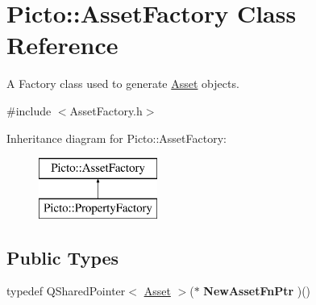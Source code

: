 \hypertarget{class_picto_1_1_asset_factory}{\section{Picto\-:\-:Asset\-Factory Class Reference}
\label{class_picto_1_1_asset_factory}
}


A Factory class used to generate \hyperlink{class_picto_1_1_asset}{Asset} objects.  




{\ttfamily \#include $<$Asset\-Factory.\-h$>$}

Inheritance diagram for Picto\-:\-:Asset\-Factory\-:\begin{figure}[H]
\begin{center}
\leavevmode
\includegraphics[height=2.000000cm]{class_picto_1_1_asset_factory}
\end{center}
\end{figure}
\subsection*{Public Types}
\begin{DoxyCompactItemize}
\item 
\hypertarget{class_picto_1_1_asset_factory_a5f2f5346f657db106bb4a1dc4ff189c7}{typedef Q\-Shared\-Pointer$<$ \hyperlink{class_picto_1_1_asset}{Asset} $>$($\ast$ {\bfseries New\-Asset\-Fn\-Ptr} )()}\label{class_picto_1_1_asset_factory_a5f2f5346f657db106bb4a1dc4ff189c7}

\end{DoxyCompactItemize}

